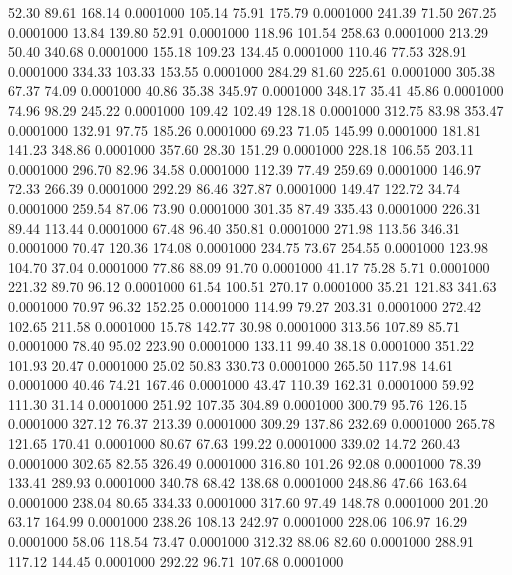   52.30   89.61  168.14   0.0001000
 105.14   75.91  175.79   0.0001000
 241.39   71.50  267.25   0.0001000
  13.84  139.80   52.91   0.0001000
 118.96  101.54  258.63   0.0001000
 213.29   50.40  340.68   0.0001000
 155.18  109.23  134.45   0.0001000
 110.46   77.53  328.91   0.0001000
 334.33  103.33  153.55   0.0001000
 284.29   81.60  225.61   0.0001000
 305.38   67.37   74.09   0.0001000
  40.86   35.38  345.97   0.0001000
 348.17   35.41   45.86   0.0001000
  74.96   98.29  245.22   0.0001000
 109.42  102.49  128.18   0.0001000
 312.75   83.98  353.47   0.0001000
 132.91   97.75  185.26   0.0001000
  69.23   71.05  145.99   0.0001000
 181.81  141.23  348.86   0.0001000
 357.60   28.30  151.29   0.0001000
 228.18  106.55  203.11   0.0001000
 296.70   82.96   34.58   0.0001000
 112.39   77.49  259.69   0.0001000
 146.97   72.33  266.39   0.0001000
 292.29   86.46  327.87   0.0001000
 149.47  122.72   34.74   0.0001000
 259.54   87.06   73.90   0.0001000
 301.35   87.49  335.43   0.0001000
 226.31   89.44  113.44   0.0001000
  67.48   96.40  350.81   0.0001000
 271.98  113.56  346.31   0.0001000
  70.47  120.36  174.08   0.0001000
 234.75   73.67  254.55   0.0001000
 123.98  104.70   37.04   0.0001000
  77.86   88.09   91.70   0.0001000
  41.17   75.28    5.71   0.0001000
 221.32   89.70   96.12   0.0001000
  61.54  100.51  270.17   0.0001000
  35.21  121.83  341.63   0.0001000
  70.97   96.32  152.25   0.0001000
 114.99   79.27  203.31   0.0001000
 272.42  102.65  211.58   0.0001000
  15.78  142.77   30.98   0.0001000
 313.56  107.89   85.71   0.0001000
  78.40   95.02  223.90   0.0001000
 133.11   99.40   38.18   0.0001000
 351.22  101.93   20.47   0.0001000
  25.02   50.83  330.73   0.0001000
 265.50  117.98   14.61   0.0001000
  40.46   74.21  167.46   0.0001000
  43.47  110.39  162.31   0.0001000
  59.92  111.30   31.14   0.0001000
 251.92  107.35  304.89   0.0001000
 300.79   95.76  126.15   0.0001000
 327.12   76.37  213.39   0.0001000
 309.29  137.86  232.69   0.0001000
 265.78  121.65  170.41   0.0001000
  80.67   67.63  199.22   0.0001000
 339.02   14.72  260.43   0.0001000
 302.65   82.55  326.49   0.0001000
 316.80  101.26   92.08   0.0001000
  78.39  133.41  289.93   0.0001000
 340.78   68.42  138.68   0.0001000
 248.86   47.66  163.64   0.0001000
 238.04   80.65  334.33   0.0001000
 317.60   97.49  148.78   0.0001000
 201.20   63.17  164.99   0.0001000
 238.26  108.13  242.97   0.0001000
 228.06  106.97   16.29   0.0001000
  58.06  118.54   73.47   0.0001000
 312.32   88.06   82.60   0.0001000
 288.91  117.12  144.45   0.0001000
 292.22   96.71  107.68   0.0001000
